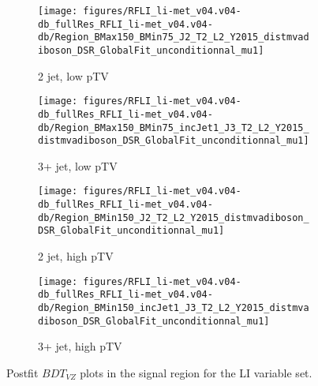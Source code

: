 \begin{figure}[!htbp]\captionsetup{justification=centering}
  \centering
\begin{subfigure}[t]{0.45000\textwidth}\centering\texttt{[image: figures/RFLI\_li-met\_v04.v04-db\_fullRes\_RFLI\_li-met\_v04.v04-db/Region\_BMax150\_BMin75\_J2\_T2\_L2\_Y2015\_distmvadiboson\_DSR\_GlobalFit\_unconditionnal\_mu1]}\caption{2 jet, low pTV}\end{subfigure}
\begin{subfigure}[t]{0.45000\textwidth}\centering\texttt{[image: figures/RFLI\_li-met\_v04.v04-db\_fullRes\_RFLI\_li-met\_v04.v04-db/Region\_BMax150\_BMin75\_incJet1\_J3\_T2\_L2\_Y2015\_distmvadiboson\_DSR\_GlobalFit\_unconditionnal\_mu1]}\caption{3+ jet, low pTV}\end{subfigure}
\begin{subfigure}[t]{0.45000\textwidth}\centering\texttt{[image: figures/RFLI\_li-met\_v04.v04-db\_fullRes\_RFLI\_li-met\_v04.v04-db/Region\_BMin150\_J2\_T2\_L2\_Y2015\_distmvadiboson\_DSR\_GlobalFit\_unconditionnal\_mu1]}\caption{2 jet, high pTV}\end{subfigure}
\begin{subfigure}[t]{0.45000\textwidth}\centering\texttt{[image: figures/RFLI\_li-met\_v04.v04-db\_fullRes\_RFLI\_li-met\_v04.v04-db/Region\_BMin150\_incJet1\_J3\_T2\_L2\_Y2015\_distmvadiboson\_DSR\_GlobalFit\_unconditionnal\_mu1]}\caption{3+ jet, high pTV}\end{subfigure}
  \caption{Postfit $BDT_{VZ}$ plots in the signal region for the LI variable set.}
  \label{fig:LIPostfitmvavz}
\end{figure}

